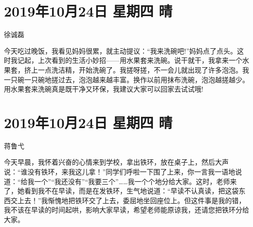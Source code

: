 \section{2019年10月24日 星期四 晴}

徐诚磊

今天吃过晚饭，我看见妈妈很累，就主动提议：``我来洗碗吧!''妈妈点了点头。这时我记起，上次看到的生活小妙招------用水果套来洗碗。说干就干，我拿来一个水果套，挤上一点洗洁精，开始洗碗了。我搓呀搓，不一会儿就出现了许多泡泡。我一只碗一只碗地搓过去，泡泡越来越丰富。换作以前用抹布洗碗，泡泡越搓越少。用水果套来洗碗真是既干净又环保，我建议大家可以回家去试试哦!

\section{2019年10月24日 星期四 晴}

蒋鲁弋

今天早晨，我怀着兴奋的心情来到学校，拿出铁环，放在桌子上，然后大声说：``谁没有铁环，来我这儿拿！''同学们呼啦一下围了上来，你一言我一语地说道：``给我一个''``我还没有''``我要三个''\ldots\ldots 我一个个地分给大家。这时，老师来了，她看到我不在早读，而是在发铁环，生气地说道：``早读不认真读，把这袋东西交上去！''我惭愧地把铁环交了上去，委屈地坐回座位上。但这件事是我的错，我不该在早读的时间起哄，影响大家早读，希望老师能原谅我，还请您把铁环分给大家。
